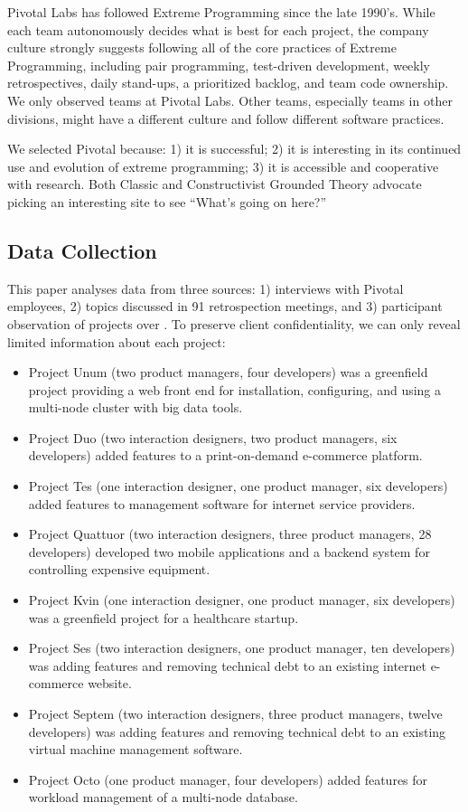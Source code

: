 Pivotal Labs has followed Extreme Programming \cite{BeckExtremeProgramming2004} since the late 1990's. While each team autonomously decides what is best for each project, the company culture strongly suggests following all of the core practices of Extreme Programming, including pair programming, test-driven development, weekly retrospectives, daily stand-ups, a prioritized backlog, and team code ownership. We only observed teams at Pivotal Labs. Other teams, especially teams in other divisions, might have a different culture and follow different software practices.


We selected Pivotal because: 1) it is successful; 2) it is interesting in its continued use and evolution of extreme programming; 3) it is accessible and cooperative with research. Both Classic and Constructivist Grounded Theory advocate picking an interesting site to see “What's going on here?” 
\subsection{Data Collection}
This paper analyses data from three sources: 1) interviews with Pivotal employees, 2) topics discussed in 91 retrospection meetings, and 3) participant observation of \numberOfObservedProjects{} projects over \durationOfResearchStudyPlural{}. To preserve client confidentiality, we can only reveal limited information about each project:


\begin{itemize}
\item Project Unum (two product managers, four developers) was a greenfield project providing a web front end for installation, configuring, and using a multi-node cluster with big data tools. 
\item Project Duo (two interaction designers, two product managers, six developers) added features to a print-on-demand e-commerce platform. 
\item Project Tes (one interaction designer, one product manager, six developers) added features to management software for internet service providers.
\item Project Quattuor (two interaction designers, three product managers, 28 developers) developed two mobile applications and a backend system for controlling expensive equipment.
\item Project Kvin (one interaction designer, one product manager, six developers) was a greenfield project for a healthcare startup. 
\item Project Ses (two interaction designers, one product manager, ten developers) was adding features and removing technical debt to an existing internet e-commerce website.
\item Project Septem (two interaction designers, three product managers, twelve developers) was adding features and removing technical debt to an existing virtual machine management software.
\item Project Octo (one product manager, four developers) added features for  workload management of a multi-node database.
\end{itemize}
